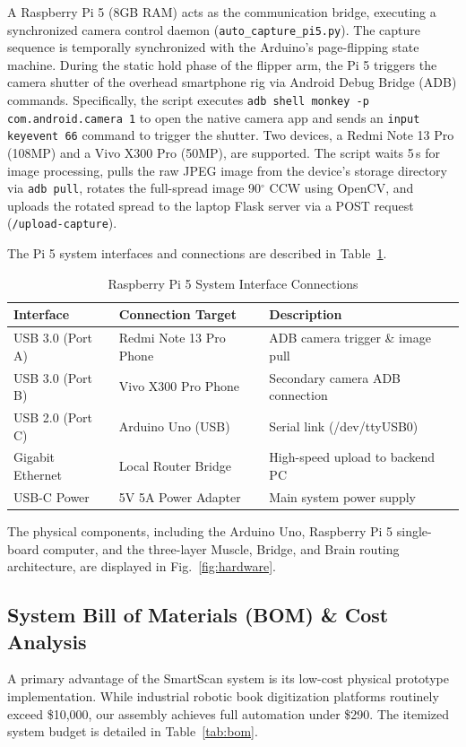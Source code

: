 \documentclass[conference]{IEEEtran}
\begin{document}
A Raspberry Pi 5 (8GB RAM) acts as the communication bridge, executing a synchronized camera control daemon (\texttt{auto\_capture\_pi5.py}). The capture sequence is temporally synchronized with the Arduino's page-flipping state machine. During the static hold phase of the flipper arm, the Pi 5 triggers the camera shutter of the overhead smartphone rig via Android Debug Bridge (ADB) commands. Specifically, the script executes \texttt{adb shell monkey -p com.android.camera 1} to open the native camera app and sends an \texttt{input keyevent 66} command to trigger the shutter. Two devices, a Redmi Note 13 Pro (108MP) and a Vivo X300 Pro (50MP), are supported. The script waits 5\,s for image processing, pulls the raw JPEG image from the device's storage directory via \texttt{adb pull}, rotates the full-spread image 90$^\circ$ CCW using OpenCV, and uploads the rotated spread to the laptop Flask server via a POST request (\texttt{/upload-capture}).

The Pi 5 system interfaces and connections are described in Table~\ref{tab:pi_ports}.

\begin{table}[htbp]
\caption{Raspberry Pi 5 System Interface Connections}
\begin{center}
\footnotesize
\begin{tabular}{|p{2.2cm}|p{2.0cm}|p{3.2cm}|}
\hline
\textbf{Interface} & \textbf{Connection Target} & \textbf{Description} \\
\hline
USB 3.0 (Port A) & Redmi Note 13 Pro Phone & ADB camera trigger \& image pull \\
USB 3.0 (Port B) & Vivo X300 Pro Phone & Secondary camera ADB connection \\
USB 2.0 (Port C) & Arduino Uno (USB) & Serial link (/dev/ttyUSB0) \\
Gigabit Ethernet & Local Router Bridge & High-speed upload to backend PC \\
USB-C Power & 5V 5A Power Adapter & Main system power supply \\
\hline
\end{tabular}
\label{tab:pi_ports}
\end{center}
\end{table}

The physical components, including the Arduino Uno, Raspberry Pi 5 single-board computer, and the three-layer Muscle, Bridge, and Brain routing architecture, are displayed in Fig.~\ref{fig:hardware}.

\subsection{System Bill of Materials (BOM) \& Cost Analysis}
A primary advantage of the SmartScan system is its low-cost physical prototype implementation. While industrial robotic book digitization platforms routinely exceed \$10,000, our assembly achieves full automation under \$290. The itemized system budget is detailed in Table~\ref{tab:bom}.
\end{document}
